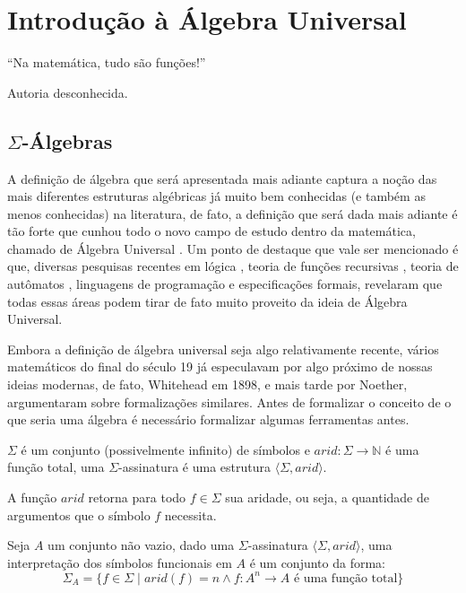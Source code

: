 \chapter{Introdução à Álgebra Universal}\label{cap:Semigroups}

\epigraph{``Na matemática, tudo são funções!''}{Autoria desconhecida.}

\section{$\Sigma$-Álgebras}\label{sec:basicSemigroups}

A definição de álgebra que será apresentada mais adiante captura a noção das mais diferentes estruturas algébricas já muito bem conhecidas (e também as menos conhecidas) na literatura, de fato, a definição que será dada mais adiante é tão forte que cunhou todo o novo campo de estudo dentro da matemática, chamado de Álgebra Universal \cite{denecke2018}. Um ponto de destaque que vale ser mencionado é que, diversas pesquisas recentes em lógica \cite{plotkin2012, riche2005}, teoria de funções recursivas \cite{rajesh2025}, teoria de autômatos \cite{gorrieri2023}, linguagens de programação e especificações formais, revelaram que todas essas áreas podem tirar de fato muito proveito da ideia de Álgebra Universal.

Embora a definição de álgebra universal seja algo relativamente recente, vários matemáticos do final do século 19 já especulavam por algo próximo de nossas ideias modernas, de fato, Whitehead em 1898, e mais tarde por Noether, argumentaram sobre formalizações similares. Antes de formalizar o conceito de o que seria uma álgebra é necessário formalizar algumas ferramentas antes.

\begin{definicao}\label{def:SigmaAssinatura}
  $\Sigma$ é um conjunto (possivelmente infinito) de símbolos e $arid: \Sigma \rightarrow \mathbb{N}$ é uma função total, uma $\Sigma$-assinatura é uma estrutura $\langle \Sigma, arid \rangle$.
\end{definicao}

A função $arid$ retorna para todo $f \in \Sigma$ sua aridade, ou seja, a quantidade de argumentos que o símbolo $f$ necessita.

\begin{definicao}\label{def:SemanticaSigmaAlgebra}
  Seja $A$ um conjunto não vazio, dado uma $\Sigma$-assinatura $\langle \Sigma, arid \rangle$, uma interpretação dos símbolos funcionais em $A$ é um conjunto da forma:
  \begin{equation}
    \Sigma_A = \{f \in \Sigma \mid arid(f) = n \land f: A^n \rightarrow A \text{ é uma função total}\}
  \end{equation}
\end{definicao}

